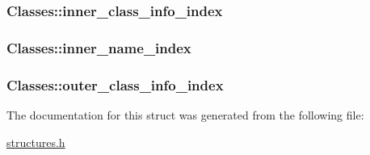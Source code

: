 \subsubsection[{\texorpdfstring{inner\+\_\+class\+\_\+info\+\_\+index}{inner_class_info_index}}]{ Classes\+::inner\+\_\+class\+\_\+info\+\_\+index}\hypertarget{structClasses_a81deba58ea3d27176396999857216eba}{}\label{structClasses_a81deba58ea3d27176396999857216eba}
\subsubsection[{\texorpdfstring{inner\+\_\+name\+\_\+index}{inner_name_index}}]{ Classes\+::inner\+\_\+name\+\_\+index}\hypertarget{structClasses_ae675c3ce50aa5f7714c632aef5b004b9}{}\label{structClasses_ae675c3ce50aa5f7714c632aef5b004b9}
\subsubsection[{\texorpdfstring{outer\+\_\+class\+\_\+info\+\_\+index}{outer_class_info_index}}]{ Classes\+::outer\+\_\+class\+\_\+info\+\_\+index}\hypertarget{structClasses_a7437bc55eb998ea0d4eec7b8ebda32c5}{}\label{structClasses_a7437bc55eb998ea0d4eec7b8ebda32c5}


The documentation for this struct was generated from the following file\+:\begin{DoxyCompactItemize}
\item 
\hyperlink{structures_8h}{structures.\+h}\end{DoxyCompactItemize}
